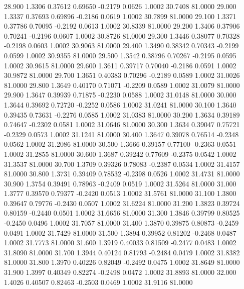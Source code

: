   28.900   1.3306   0.37612   0.69650  -0.2179   0.0626   1.0002  30.7408  81.0000
  29.000   1.3337   0.37693   0.69896  -0.2186   0.0619   1.0002  30.7899  81.0000
  29.100   1.3371   0.37786   0.70095  -0.2192   0.0613   1.0002  30.8339  81.0000
  29.200   1.3406   0.37906   0.70241  -0.2196   0.0607   1.0002  30.8726  81.0000
  29.300   1.3446   0.38077   0.70328  -0.2198   0.0603   1.0002  30.9063  81.0000
  29.400   1.3490   0.38342   0.70343  -0.2199   0.0599   1.0002  30.9355  81.0000
  29.500   1.3542   0.38796   0.70267  -0.2195   0.0595   1.0002  30.9615  81.0000
  29.600   1.3611   0.39717   0.70040  -0.2186   0.0591   1.0002  30.9872  81.0000
  29.700   1.3651   0.40383   0.70296  -0.2189   0.0589   1.0002  31.0026  81.0000
  29.800   1.3649   0.40170   0.71071  -0.2209   0.0589   1.0002  31.0079  81.0000
  29.900   1.3647   0.39939   0.71875  -0.2230   0.0588   1.0002  31.0148  81.0000
  30.000   1.3644   0.39692   0.72720  -0.2252   0.0586   1.0002  31.0241  81.0000
  30.100   1.3640   0.39435   0.73631  -0.2276   0.0585   1.0002  31.0383  81.0000
  30.200   1.3634   0.39189   0.74647  -0.2302   0.0581   1.0002  31.0646  81.0000
  30.300   1.3634   0.39047   0.75721  -0.2329   0.0573   1.0002  31.1241  81.0000
  30.400   1.3647   0.39078   0.76514  -0.2348   0.0562   1.0002  31.2086  81.0000
  30.500   1.3666   0.39157   0.77100  -0.2363   0.0551   1.0002  31.2855  81.0000
  30.600   1.3687   0.39242   0.77609  -0.2375   0.0542   1.0002  31.3537  81.0000
  30.700   1.3709   0.39326   0.78083  -0.2387   0.0534   1.0002  31.4157  81.0000
  30.800   1.3731   0.39409   0.78532  -0.2398   0.0526   1.0002  31.4731  81.0000
  30.900   1.3754   0.39491   0.78963  -0.2409   0.0519   1.0002  31.5264  81.0000
  31.000   1.3777   0.39570   0.79377  -0.2420   0.0513   1.0002  31.5761  81.0000
  31.100   1.3800   0.39647   0.79776  -0.2430   0.0507   1.0002  31.6224  81.0000
  31.200   1.3823   0.39724   0.80159  -0.2440   0.0501   1.0002  31.6656  81.0000
  31.300   1.3846   0.39799   0.80525  -0.2450   0.0496   1.0002  31.7057  81.0000
  31.400   1.3870   0.39875   0.80873  -0.2459   0.0491   1.0002  31.7429  81.0000
  31.500   1.3894   0.39952   0.81202  -0.2468   0.0487   1.0002  31.7773  81.0000
  31.600   1.3919   0.40033   0.81509  -0.2477   0.0483   1.0002  31.8090  81.0000
  31.700   1.3944   0.40124   0.81793  -0.2484   0.0479   1.0002  31.8382  81.0000
  31.800   1.3970   0.40226   0.82049  -0.2492   0.0475   1.0002  31.8649  81.0000
  31.900   1.3997   0.40349   0.82274  -0.2498   0.0472   1.0002  31.8893  81.0000
  32.000   1.4026   0.40507   0.82463  -0.2503   0.0469   1.0002  31.9116  81.0000

